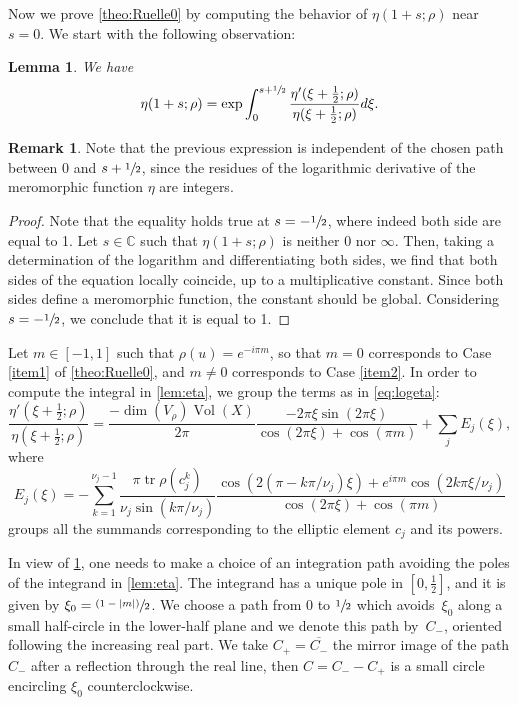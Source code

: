 \documentclass[10pt]{amsart}
\newcommand{\psfrac}[2]{\sfrac{(#1)}{#2}}
\theoremstyle{plain}
\newtheorem{lem}[thm]{Lemma}
\theoremstyle{definition}
\newtheorem{rmrk}[thm]{Remark}
\theoremstyle{remark}
\newcommand{\C}{\mathbb{C}}
\DeclareMathOperator{\tr}{tr}
\DeclareMathOperator{\Vol}{Vol}
\numberwithin{equation}{section}
\begin{document}
Now we prove \cref{theo:Ruelle0} by computing the behavior of $\eta(1+s;\rho)$ near $s=0$. We start with the following observation:
\begin{lem}
We have
\begin{equation}
\label{lem:eta}
\eta(1+s;\rho) = \exp \int_0^{s+\sfrac 1 2} \frac {\eta'(\xi+\frac 1 2;\rho)}{\eta(\xi+ \frac 1 2;\rho)} d\xi.
\end{equation}
\end{lem}
\begin{rmrk}
\label{remk:residues}
Note that the previous expression is independent of the chosen path between $0$ and $s+ \sfrac 1 2$, since the residues of the logarithmic derivative of the meromorphic function $\eta$ are integers.
\end{rmrk}

\begin{proof}
Note that the equality holds true at $s=-\sfrac{1}{2}$, where indeed both side are equal to 1. Let $s\in \C$ such that $\eta(1+s;\rho)$ is neither $0$ nor $\infty$. Then, taking a determination of the logarithm and differentiating both sides, we find that both sides of the equation locally coincide, up to a multiplicative constant. Since both sides define a meromorphic function, the constant should be global.
Considering $s=-\sfrac{1}{2}$, we conclude that it is equal to 1.
\end{proof}

Let $m \in [-1,1]$ such that $\rho(u) = e^{-i \pi m}$, so that $m=0$ corresponds to Case \ref{item1} of \cref{theo:Ruelle0}, and $m\neq 0$ corresponds to Case \ref{item2}.
In order to compute the integral in \cref{lem:eta}, we group the terms as in \cref{eq:logeta}:
\begin{equation}
\label{eq:sum}
\frac {\eta'(\xi+\frac 1 2;\rho)}{\eta(\xi+ \frac 1 2;\rho)} = \frac{-\dim(V_\rho) \Vol(X)}{2\pi} \frac {-2\pi \xi \sin(2\pi \xi)}{\cos(2\pi\xi) + \cos(\pi m)} + \sum_j E_j(\xi),
\end{equation}
where
\begin{equation}
\label{eq:Ei}
E_j(\xi) = -\sum_{k=1}^{\nu_j -1}\frac{\pi \tr \rho(c_j^k)}{\nu_j \sin (k \pi/\nu_j)} \frac{\cos \left(2(\pi-k\pi/\nu_j)\xi\right) + e^{i\pi m}\cos (2k\pi \xi/\nu_j)}{\cos(2\pi \xi)+ \cos(\pi m)}
\end{equation}
groups all the summands corresponding to the elliptic element $c_j$ and its powers.

In view of \cref{remk:residues}, one needs to make a choice of an integration path avoiding the poles of the integrand in \cref{lem:eta}. The integrand has a unique pole in $[0, \frac 1 2]$, and it is given by $\xi_0=\psfrac{1-|m|}{2}$. We choose a path from $0$ to $\sfrac{1}{2}$ which avoids~$\xi_0$ along a small half-circle in the lower-half plane and we denote this path by~$C_-$, oriented following the increasing real part. We take $C_+ = \overline {C_-}$ the mirror image of the path $C_-$ after a reflection through the real line, then $C = C_- - C_+$ is a small circle encircling $\xi_0$ counterclockwise.
\end{document}
